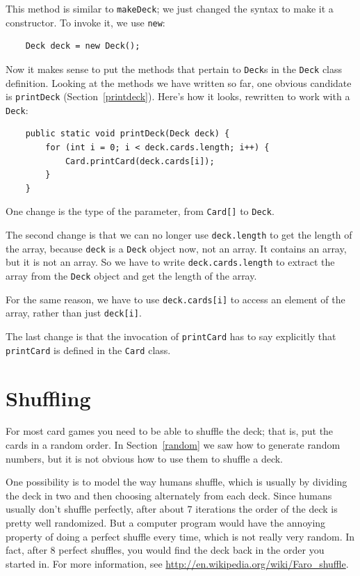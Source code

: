 \documentclass[12pt]{book}
\theoremstyle{exercise}
\begin{document}
This method is similar to {\tt makeDeck};
we just changed the syntax to make it a constructor.
To invoke it, we use {\tt new}:


\begin{lstlisting}
    Deck deck = new Deck();
\end{lstlisting}
%
Now it makes sense to put
the methods that pertain to {\tt Deck}s in the {\tt Deck}
class definition.  Looking at the methods we have written so
far, one obvious candidate is {\tt printDeck} (Section~\ref{printdeck}).
Here's how it looks, rewritten to work with a {\tt Deck}:

\begin{lstlisting}
    public static void printDeck(Deck deck) {
        for (int i = 0; i < deck.cards.length; i++) {
            Card.printCard(deck.cards[i]);
        }
    }
\end{lstlisting}
%
One change is the type of the parameter,
from {\tt Card[]} to {\tt Deck}.

The second change is that we can no
longer use {\tt deck.length} to get the length of the array, because
{\tt deck} is a {\tt Deck} object now, not an array.  It contains an
array, but it is not an array.  So we have to write
{\tt deck.cards.length} to extract the array from the {\tt Deck}
object and get the length of the array.

For the same reason, we have to use {\tt deck.cards[i]} to access an
element of the array, rather than just {\tt deck[i]}.

The last change
is that the invocation of {\tt printCard} has to say explicitly that
{\tt printCard} is defined in the {\tt Card} class.


\section{Shuffling}
\label{shuffle}

For most card games you need to be able to shuffle the deck;
that is, put the cards in a random order.  In Section~\ref{random}
we saw how to generate random numbers, but it is not obvious how
to use them to shuffle a deck.

One possibility is to model the way humans shuffle, which is usually
by dividing the deck in two and then choosing
alternately from each deck.  Since humans usually don't shuffle
perfectly, after about 7 iterations the order of the deck is pretty
well randomized.  But a computer program would have the annoying
property of doing a perfect shuffle every time, which is not really
very random.  In fact, after 8 perfect shuffles, you would find the
deck back in the order you started in.  For more information, see
\url{http://en.wikipedia.org/wiki/Faro_shuffle}.
\end{document}
